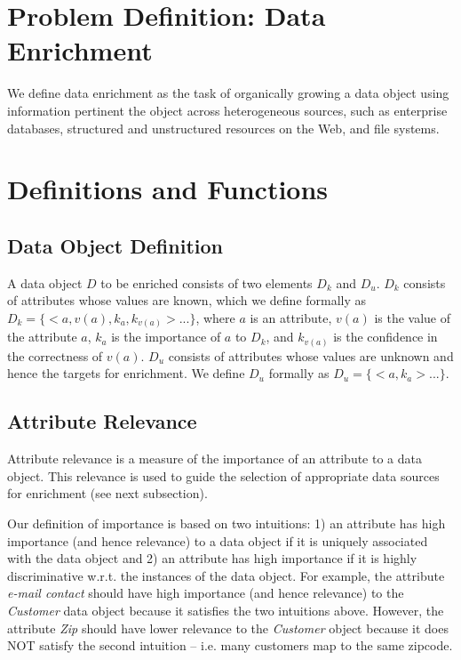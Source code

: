 \section{Problem Definition: Data Enrichment}

We define data enrichment as the task of organically growing a data object using information pertinent the object 
across heterogeneous sources, such as enterprise databases, structured and unstructured resources on the Web, and 
file systems. 


\section{Definitions and Functions}

\subsection{Data Object Definition}

A data object $D$ to be enriched consists of two elements $D_k$ and $D_u$. $D_k$ consists of attributes whose 
values are known, which we define formally as $D_k= \lbrace <a,v(a),k_a,k_{v(a)}> ... \rbrace$, where $a$ is 
an attribute, $v(a)$ is the value of the attribute $a$, $k_a$ is the importance of $a$ to $D_k$, and $k_{v(a)}$ 
is the confidence in the correctness of $v(a)$. $D_u$ consists of attributes whose values are unknown and hence 
the targets for enrichment. We define $D_u$ formally as $D_u= \lbrace <a,k_a> ... \rbrace$.
    
\subsection{Attribute Relevance} 

Attribute relevance is a measure of the importance of an attribute to a data object. This relevance is used 
to guide the selection of appropriate data sources for enrichment (see next subsection).

Our definition of importance is based on two intuitions: 1) an attribute has high importance (and hence 
relevance) to a data object if it is uniquely associated with the data object and 2) an attribute has high 
importance if it is highly discriminative w.r.t. the instances of the data object. For example, the attribute 
{\it e-mail contact} should have high importance (and hence relevance) to the {\it Customer} data object 
because it satisfies the two intuitions above. However, the attribute {\it Zip} should have lower relevance
to the {\it Customer} object because it does NOT satisfy the second intuition -- i.e. many customers map
to the same zipcode.


